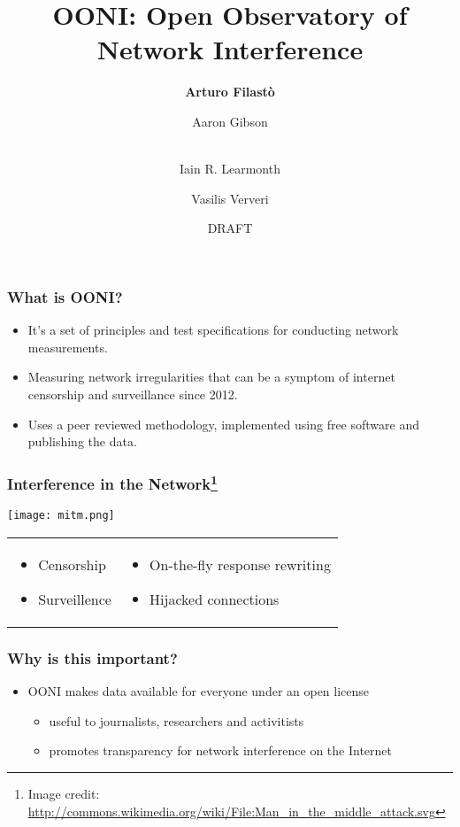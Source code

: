 \documentclass{beamer}
\begin{document}
\title[OONI]{OONI: Open Observatory of Network Interference}
\author[Arturo Filast\`{o}]{{\bf Arturo Filast\`{o}} \and
	{Aaron Gibson} \and \\
	{Iain R. Learmonth} \and
	{Vasilis Ververi}}
\date{DRAFT} 

\begin{frame}
\maketitle
\end{frame}

\begin{frame}
	\frametitle{What is OONI?}
	\begin{itemize}
		\item{It’s a set of principles and test specifications for
			conducting network measurements.}
		\item{Measuring network irregularities that can be a symptom of
			internet censorship and surveillance since 2012.}
		\item{Uses a peer reviewed methodology, implemented using free
			software and publishing the data.}
	\end{itemize}
\end{frame}

\begin{frame}
	\frametitle{Interference in the Network\footnote{\tiny Image credit: \url{http://commons.wikimedia.org/wiki/File:Man_in_the_middle_attack.svg}}}
	\begin{center}
		\texttt{[image: mitm.png]}
	\end{center}
	\begin{tabular}{ p{} p{} }
	\begin{itemize}
		\item{Censorship}
		\item{Surveillence}
	\end{itemize} &
	\begin{itemize}
		\item{On-the-fly response rewriting}
		\item{Hijacked connections}
	\end{itemize}
\end{tabular}
\end{frame}

\begin{frame}
	\frametitle{Why is this important?}
	\begin{itemize}
		\item{OONI makes data available for everyone under an open
			license}
			\begin{itemize}
				\item{useful to journalists, researchers and activitists}
				\item{promotes transparency for network interference on the Internet}
			\end{itemize}
	\end{itemize}
\end{frame}
\end{document}
